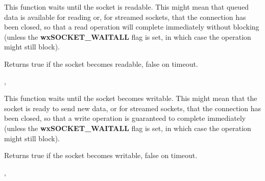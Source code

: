 This function waits until the socket is readable. This might mean that
queued data is available for reading or, for streamed sockets, that
the connection has been closed, so that a read operation will complete
immediately without blocking (unless the {\bf wxSOCKET\_WAITALL} flag
is set, in which case the operation might still block).





Returns true if the socket becomes readable, false on timeout.


, 

%
%
\label{wxsocketbasewaitforwrite}


This function waits until the socket becomes writable. This might mean that
the socket is ready to send new data, or for streamed sockets, that the
connection has been closed, so that a write operation is guaranteed to
complete immediately (unless the {\bf wxSOCKET\_WAITALL} flag is set,
in which case the operation might still block).





Returns true if the socket becomes writable, false on timeout.


, 

%
%
\label{wxsocketbasewrite}

